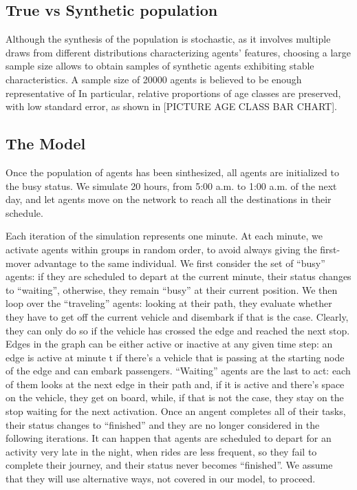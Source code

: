 \subsection{True vs Synthetic population}
Although the synthesis of the population is stochastic, as it involves multiple draws from different distributions characterizing agents' features, choosing a large sample size allows to obtain samples of synthetic agents exhibiting stable characteristics. A sample size of 20000 agents is believed to be enough representative of In particular, relative proportions of age classes are preserved, with low standard error, as shown in [PICTURE AGE CLASS BAR CHART].

\subsection{The Model}

Once the population of agents has been sinthesized, all agents are initialized to the busy status. We simulate 20 hours, from 5:00 a.m. to 1:00 a.m. of the next day, and let agents move on the network to reach all the destinations in their schedule. 

Each iteration of the simulation represents one minute. At each minute, we activate agents within groups in random order, to avoid always giving the first-mover advantage to the same individual. We first consider the set of “busy” agents: if they are scheduled to depart at the current minute, their status changes to “waiting”, otherwise, they remain “busy” at their current position. We then loop over the “traveling” agents: looking at their path, they evaluate whether they have to get off the current vehicle and disembark if that is the case. Clearly, they can only do so if the vehicle has crossed the edge and reached the next stop. Edges in the graph can be either active or inactive at any given time step: an edge is active at minute t if there’s a vehicle that is passing at the starting node of the edge and can embark passengers. “Waiting” agents are the last to act: each of them looks at the next edge in their path and, if it is active and there’s space on the vehicle, they get on board, while, if that is not the case, they stay on the stop waiting for the next activation. Once an angent completes all of their tasks, their status changes to “finished” and they are no longer considered in the following iterations. It can happen that agents are scheduled to depart for an activity very late in the night, when rides are less frequent, so they fail to complete their journey, and their status never becomes “finished”. We assume that they will use alternative ways, not covered in our model, to proceed.

